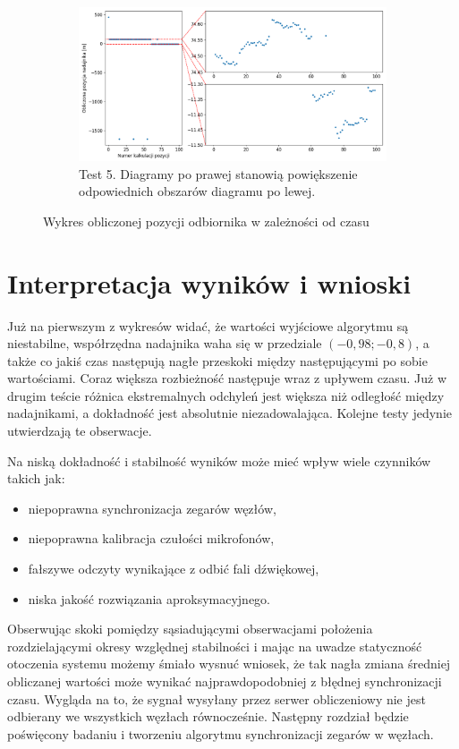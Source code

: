 \begin{figure}[H]
    \ContinuedFloat\centering
    \begin{subfigure}{\textwidth}\label{fig:position_4}
        \centering
        \includegraphics[width=0.95\linewidth]{pics/position/position_4.png}
        \caption{Test 5. Diagramy po prawej stanowią powiększenie odpowiednich obszarów diagramu po lewej.}
    \end{subfigure}
    \caption{Wykres obliczonej pozycji odbiornika w zależności od czasu}
    \label{fig:position}
\end{figure}

\section{Interpretacja wyników i wnioski}

Już na pierwszym z wykresów widać, że wartości wyjściowe algorytmu są niestabilne, współrzędna nadajnika waha się w przedziale $(-0,98; -0,8)$, a także co jakiś czas następują nagłe przeskoki między następującymi po sobie wartościami. Coraz większa rozbieżność następuje wraz z upływem czasu. Już w drugim teście różnica ekstremalnych odchyleń jest większa niż odległość między nadajnikami, a dokładność jest absolutnie niezadowalająca. Kolejne testy jedynie utwierdzają te obserwacje.

Na niską dokładność i stabilność wyników może mieć wpływ wiele czynników takich jak:

\begin{itemize}
    \item niepoprawna synchronizacja zegarów węzłów,
    \item niepoprawna kalibracja czułości mikrofonów,
    \item fałszywe odczyty wynikające z odbić fali dźwiękowej,
    \item niska jakość rozwiązania aproksymacyjnego.
\end{itemize}

Obserwując skoki pomiędzy sąsiadującymi obserwacjami położenia rozdzielającymi okresy względnej stabilności i mając na uwadze statyczność otoczenia systemu możemy śmiało wysnuć wniosek, że tak nagła zmiana średniej obliczanej wartości może wynikać najprawdopodobniej z błędnej synchronizacji czasu. Wygląda na to, że sygnał wysyłany przez serwer obliczeniowy nie jest odbierany we wszystkich węzłach równocześnie. Następny rozdział będzie poświęcony badaniu i tworzeniu algorytmu synchronizacji zegarów w węzłach.